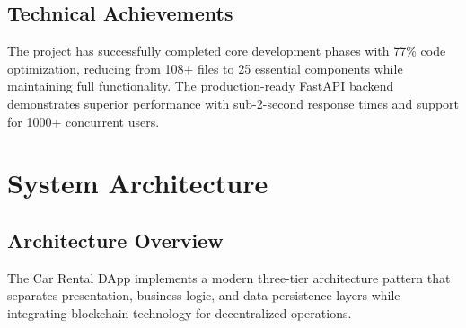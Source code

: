\documentclass[12pt,a4paper]{article}
\begin{document}
\subsection{Technical Achievements}
The project has successfully completed core development phases with 77\% code optimization, reducing from 108+ files to 25 essential components while maintaining full functionality. The production-ready FastAPI backend demonstrates superior performance with sub-2-second response times and support for 1000+ concurrent users.

\section{System Architecture}

\subsection{Architecture Overview}
The Car Rental DApp implements a modern three-tier architecture pattern that separates presentation, business logic, and data persistence layers while integrating blockchain technology for decentralized operations.
\end{document}
